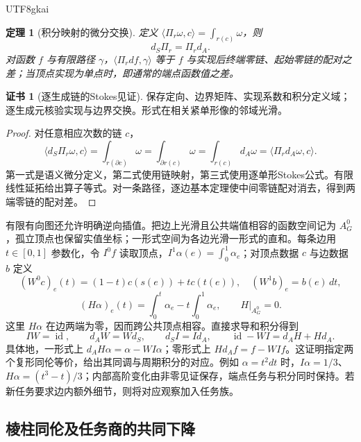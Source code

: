 \documentclass[11pt,a4paper]{article}
\theoremstyle{plain}
\newtheorem{theorem}{定理}[section]
\theoremstyle{definition}
\newtheorem*{certificate}{证书}
\theoremstyle{remark}
\begin{document}
\begin{CJK*}{UTF8}{gkai}
\begin{theorem}[积分映射的微分交换]
\label{pc:integration}
定义 $\langle\Pi_r\omega,c\rangle=\int_{r(c)}\omega$，则
\[
 d_S\Pi_r=\Pi_r d_A.
\]
对函数 $f$ 与有限路径 $\gamma$，$\langle\Pi_rdf,\gamma\rangle$ 等于 $f$ 与实现后终端零链、起始零链的配对之差；当顶点实现为单点时，即通常的端点函数值之差。
\end{theorem}
\begin{certificate}[逐生成链的Stokes见证]
保存定向、边界矩阵、实现系数和积分定义域；逐生成元核验实现与边界交换。形式在相关紧单形像的邻域光滑。
\end{certificate}
\begin{proof}
对任意相应次数的链 $c$，
\[
 \langle d_S\Pi_r\omega,c\rangle
 =\int_{r(\partial c)}\omega
 =\int_{\partial r(c)}\omega
 =\int_{r(c)}d_A\omega
 =\langle\Pi_rd_A\omega,c\rangle.
\]
第一式是语义微分定义，第二式使用链映射，第三式使用逐单形Stokes公式。有限线性延拓给出算子等式。对一条路径，逐边基本定理使中间零链配对消去，得到两端零链的配对差。
\end{proof}

有限有向图还允许明确逆向插值。把边上光滑且公共端值相容的函数空间记为 $A_G^0$，孤立顶点也保留实值坐标；一形式空间为各边光滑一形式的直和。每条边用 $t\in[0,1]$ 参数化，令 $I^0f$ 读取顶点，$I^1\alpha(e)=\int_0^1\alpha_e$；对顶点数据 $c$ 与边数据 $b$ 定义
\[
 (W^0c)_e(t)=(1-t)c(s(e))+tc(t(e)),\quad
 (W^1b)_e=b(e)\,dt,
\]
\[
 (H\alpha)_e(t)=\int_0^t\alpha_e-t\int_0^1\alpha_e,
 \qquad H|_{A_G^0}=0.
\]
这里 $H\alpha$ 在边两端为零，因而跨公共顶点相容。直接求导和积分得到
\begin{equation}
\label{pc:eq-retraction}
 IW=\operatorname{id},\qquad d_AW=Wd_S,\qquad d_SI=Id_A,
 \qquad \operatorname{id}-WI=d_AH+Hd_A.
\end{equation}
具体地，一形式上 $d_AH\alpha=\alpha-WI\alpha$；零形式上 $Hd_Af=f-WIf$。这证明指定两个复形同伦等价，给出其同调与周期积分的对应。例如 $\alpha=t^2dt$ 时，$I\alpha=1/3$、$H\alpha=(t^3-t)/3$；内部高阶变化由非零见证保存，端点任务与积分同时保持。若新任务要求边内额外细节，则将对应观察加入任务族。

\subsection{棱柱同伦及任务商的共同下降}


\end{CJK*}
\end{document}
